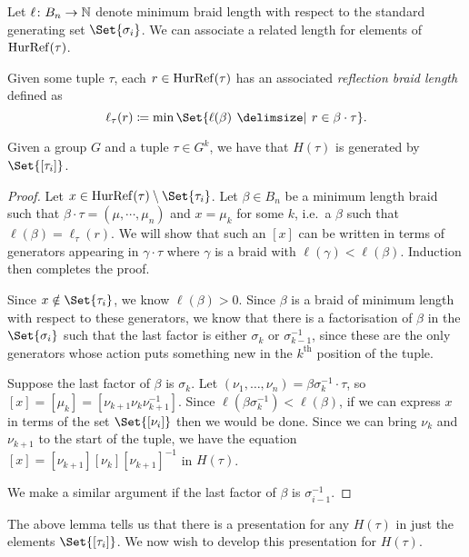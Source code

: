 Let $\ell \colon B_n \to \mathbb{N}$ denote minimum braid length with respect to the standard generating set $\Set{\sigma_i} $.
We can associate a related length for elements of $\operatorname{HurRef}(\tau)$.
\begin{definition}
	\label{def:hurref_braid_length}
	Given some tuple $\tau$, each $r \in \operatorname{HurRef}(\tau)$ has an associated \emph{reflection braid length} defined as
	\[
		\ell_\tau(r) \coloneq \min\Set{\ell(\beta) \given r \in \beta \cdot \tau}
		.\]
\end{definition}

\begin{lemma}
	\label{lem:hurwitz_group_generators}
	Given a group $G$ and a tuple $\tau \in G^k$, we have that $H(\tau)$ is generated by $\Set{[\tau_i]}$.
\end{lemma}
\begin{proof}
	Let $x \in \hurref(\tau) \setminus \Set{\tau_i}$.
	Let $\beta \in B_n$ be a minimum length braid such that $\beta \cdot \tau =(\mu,\cdots,\mu_n)$ and $x=\mu_k$ for some $k$, i.e.~a $\beta$ such that $\ell(\beta) = \ell_\tau(r)$.
	We will show that such an $[x]$ can be written in terms of generators appearing in $\gamma \cdot \tau$ where  $\gamma$ is a braid with $\ell(\gamma)<\ell(\beta)$.
	Induction then completes the proof.

	Since $x \notin \Set{\tau_i}$, we know $\ell(\beta)>0$.
	Since $\beta$ is a braid of minimum length with respect to these generators, we know that there is a factorisation of $\beta$ in the $\Set{\sigma_i} $ such that the last factor is either $\sigma_k$ or  $\sigma_{k-1}^{-1}$, since these are the only generators whose action puts something new in the $k^{\text{th}}$ position of the tuple.

	Suppose the last factor of $\beta$ is $\sigma_k$.
	Let $(\nu_1,\ldots,\nu_n) = \beta\sigma_k^{-1} \cdot \tau$, so $[x] = [\mu_k] = [\nu_{k+1}\nu_k\nu_{k+1}^{-1}]$.
	Since $\ell(\beta \sigma_k^{-1}) < \ell(\beta)$, if we can express $x$ in terms of the set $\Set{[\nu_i]}$ then we would be done.
	Since we can bring $\nu_k$ and  $\nu_{k+1}$ to the start of the tuple, we have the equation $[x]=[\nu_{k+1}][\nu_k][\nu_{k+1}]^{-1}$ in $H(\tau)$.

	We make a similar argument if the last factor of $\beta$ is  $\sigma_{i-1}^{-1}$.
\end{proof}

The above lemma tells us that there is a presentation for any $H(\tau)$ in just the elements $\Set{[\tau_i]} $.
We now wish to develop this presentation for $H(\tau)$.

